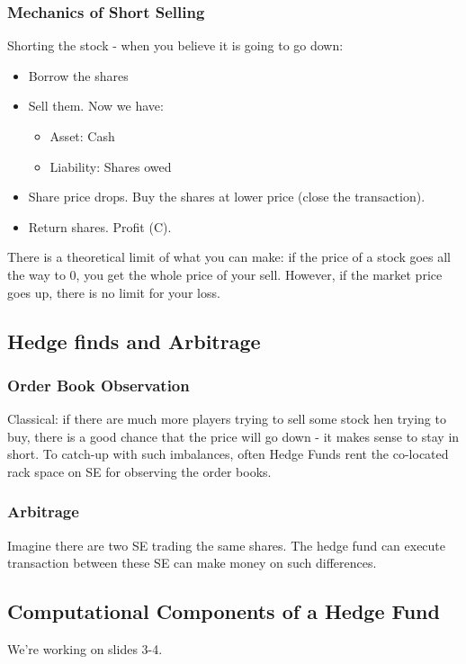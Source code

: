 \documentclass{scrartcl}
\begin{document}
\subsubsection{Mechanics of Short Selling}
\label{sec:MechanicsOfShortSelling}
Shorting the stock - when you believe it is going to go down:
\begin{itemize}
\item Borrow the shares
\item Sell them. Now we have:
  \begin{itemize}
  \item Asset: Cash
  \item Liability: Shares owed
  \end{itemize}
\item Share price drops. Buy the shares at lower price (close the transaction).
\item Return shares. Profit (C).
\end{itemize}
There is a theoretical limit of what you can make: if the price of a stock goes
all the way to 0, you get the whole price of your sell. However, if the market
price goes up, there is no limit for your loss.

\subsection{Hedge finds and Arbitrage}
\label{sec:HedgeFundsAndArbitrage}

\subsubsection{Order Book Observation}
\label{sec:OrderBookObservation}
Classical: if there are much more players trying to sell some stock hen trying
to buy, there is a good chance that the price will go down - it makes sense to
stay in short. To catch-up with such imbalances, often Hedge Funds rent the
co-located rack space on SE for observing the order books.

\subsubsection{Arbitrage}
\label{sec:HedgeFundsAndArbitrage}
Imagine there are two SE trading the same shares. The hedge fund can execute
transaction between these SE can make money on such differences.

\subsection{Computational Components of a Hedge Fund}
\label{sec:HFAnatomy}
We're working on slides 3-4.
\end{document}
